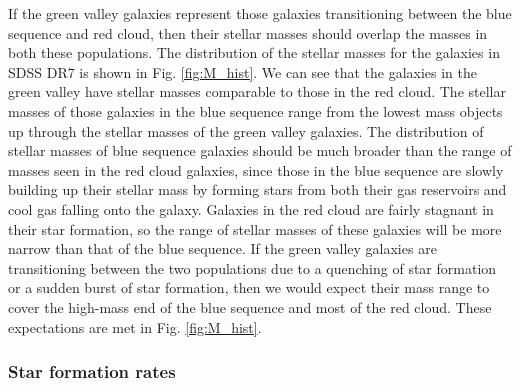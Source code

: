 If the green valley galaxies represent those galaxies transitioning between the 
blue sequence and red cloud, then their stellar masses should overlap the masses 
in both these populations.  The distribution of the stellar masses for the 
galaxies in SDSS DR7 is shown in Fig. \ref{fig:M_hist}.  We can see that the 
galaxies in the green valley have stellar masses comparable to those in the red 
cloud.  The stellar masses of those galaxies in the blue sequence range from the 
lowest mass objects up through the stellar masses of the green valley galaxies.  
The distribution of stellar masses of blue sequence galaxies should be much 
broader than the range of masses seen in the red cloud galaxies, since those in 
the blue sequence are slowly building up their stellar mass by forming stars 
from both their gas reservoirs and cool gas falling onto the galaxy.  Galaxies 
in the red cloud are fairly stagnant in their star formation, so the range of 
stellar masses of these galaxies will be more narrow than that of the blue 
sequence.  If the green valley galaxies are transitioning between the two 
populations due to a quenching of star formation or a sudden burst of star 
formation, then we would expect their mass range to cover the high-mass end of 
the blue sequence and most of the red cloud.  These expectations are met in Fig. 
\ref{fig:M_hist}.


\subsubsection{Star formation rates}


